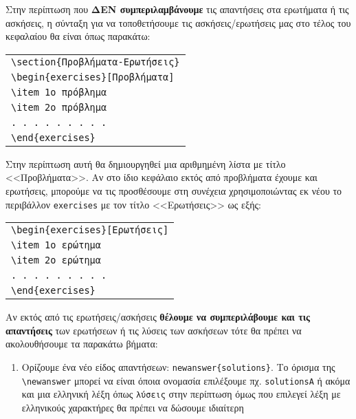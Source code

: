 \begin{refsection}
Στην περίπτωση που \textbf{ΔΕΝ συμπεριλαμβάνουμε} τις απαντήσεις στα ερωτήματα ή τις ασκήσεις,
η σύνταξη για να τοποθετήσουμε τις ασκήσεις/ερωτήσεις μας στο τέλος του κεφαλαίου θα είναι όπως
παρακάτω:
\begin{center}
\begin{tabular}{l}
\verb=\section{Προβλήματα-Ερωτήσεις}=\\
\verb=\begin{exercises}[Προβλήματα]=\\
\verb=\item 1ο πρόβλημα=\\
\verb=\item 2ο πρόβλημα=\\
\verb=. . . . . . . . .=\\
\verb=\end{exercises}=
\end{tabular}
\end{center}
Στην περίπτωση αυτή θα δημιουργηθεί μια αριθμημένη λίστα με τίτλο <<Προβλήματα>>. Αν στο ίδιο κεφάλαιο
εκτός από προβλήματα έχουμε και ερωτήσεις, μπορούμε να τις προσθέσουμε στη συνέχεια χρησιμοποιώντας
εκ νέου το περιβάλλον \texttt{exercises} με τον τίτλο <<Ερωτήσεις>> ως εξής:
\begin{center}
\begin{tabular}{l}
\verb=\begin{exercises}[Ερωτήσεις]=\\
\verb=\item 1ο ερώτημα=\\
\verb=\item 2ο ερώτημα=\\
\verb=. . . . . . . . .=\\
\verb=\end{exercises}=
\end{tabular}
\end{center}
Αν εκτός από τις ερωτήσεις/ασκήσεις \textbf{θέλουμε να συμπεριλάβουμε και τις απαντήσεις} των
ερωτήσεων ή τις λύσεις των ασκήσεων τότε θα πρέπει να ακολουθήσουμε τα παρακάτω βήματα:
\begin{enumerate}
\item Ορίζουμε ένα νέο είδος απαντήσεων: \verb|newanswer{solutions}|. Το όρισμα της \verb|\newanswer|
μπορεί να είναι όποια ονομασία επιλέξουμε πχ. \texttt{solutionsA} ή ακόμα και μια ελληνική λέξη όπως \texttt{λύσεις}
στην περίπτωση όμως που επιλεγεί λέξη με ελληνικούς χαρακτήρες θα πρέπει να δώσουμε ιδιαίτερη

\end{enumerate}
\end{refsection}
